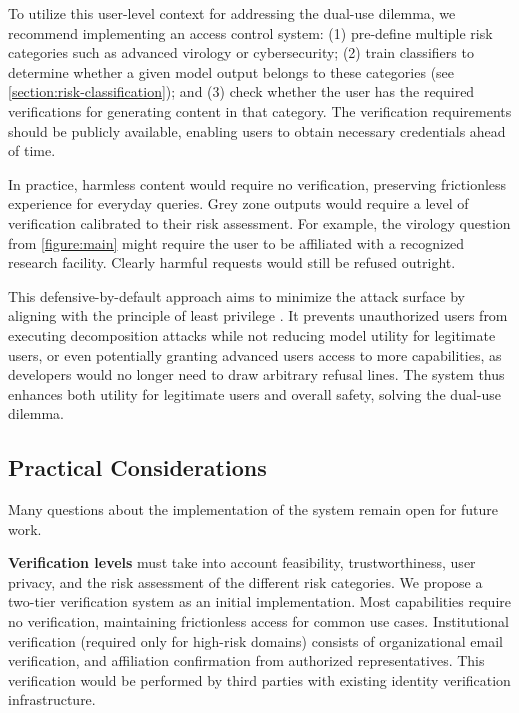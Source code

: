 \documentclass{article}
\theoremstyle{plain}
\theoremstyle{definition}
\theoremstyle{remark}
\begin{document}
To utilize this user-level context for addressing the dual-use dilemma, we recommend implementing an access control system: (1) pre-define multiple risk categories such as advanced virology or cybersecurity; (2) train classifiers to determine whether a given model output belongs to these categories (see \cref{section:risk-classification}); and (3) check whether the user has the required verifications for generating content in that category. The verification requirements should be publicly available, enabling users to obtain necessary credentials ahead of time.

In practice, harmless content would require no verification, preserving frictionless experience for everyday queries. Grey zone outputs would require a level of verification calibrated to their risk assessment. For example, the virology question from \cref{figure:main} might require the user to be affiliated with a recognized research facility. Clearly harmful requests would still be refused outright.

This defensive-by-default approach aims to minimize the attack surface by aligning with the principle of least privilege \cite{1451869}. It prevents unauthorized users from executing decomposition attacks while not reducing model utility for legitimate users, or even potentially granting advanced users access to more capabilities, as developers would no longer need to draw arbitrary refusal lines. The system thus enhances both utility for legitimate users and overall safety, solving the dual-use dilemma.

\subsection{Practical Considerations} \label{section:access-controls-future-work}

Many questions about the implementation of the system remain open for future work.

\textbf{Verification levels} must take into account feasibility, trustworthiness, user privacy, and the risk assessment of the different risk categories.
We propose a two-tier verification system as an initial implementation. Most capabilities require no verification, maintaining frictionless access for common use cases. Institutional verification (required only for high-risk domains) consists of organizational email verification, and affiliation confirmation from authorized representatives. This verification would be performed by third parties with existing identity verification infrastructure.
\end{document}
